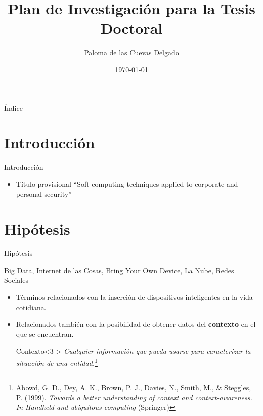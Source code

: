 \documentclass{beamer}
\title[Plan de Investigación]{Plan de Investigación para la Tesis Doctoral}
\author{Paloma de las Cuevas Delgado}
\institute{Departamento de Arquitectura y Tecnología de los Computadores}
\date{\today}
\begin{document}
\begin{frame}
  \titlepage
\end{frame}

\begin{frame}{Índice}
  \tableofcontents
\end{frame}

\section{Introducción}

\begin{frame}{Introducción}

\begin{itemize}
  \item Título provisional ``Soft computing techniques applied to corporate and personal security''
\end{itemize}

\end{frame}

\section{Hipótesis}

\begin{frame}{Hipótesis}

\begin{block}{}
Big Data, Internet de las Cosas, Bring Your Own Device, La Nube, Redes Sociales
\end{block}

\begin{itemize}
  \item<1-> Términos relacionados con la inserción de dispositivos inteligentes en la vida cotidiana.
  \item<2-> Relacionados también con la posibilidad de obtener datos del \textbf{contexto} en el que se encuentran.
  \begin{block}{Contexto}<3->
    \textit{Cualquier información que pueda usarse para caracterizar la situación de una entidad.}\footnote{{\scriptsize Abowd, G. D., Dey, A. K., Brown, P. J., Davies, N., Smith, M., \& Steggles, P. (1999). \textit{Towards a better understanding of context and context-awareness. In Handheld and ubiquitous computing} (Springer)}}
  \end{block}
\end{itemize}

\end{frame}
\end{document}
